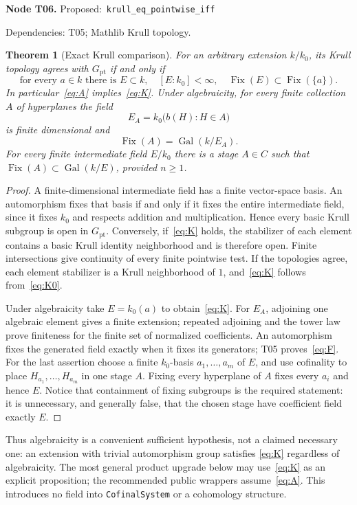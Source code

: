 \documentclass[11pt]{article}
\newtheorem{theorem}{Theorem}[section]
\theoremstyle{remark}\newtheorem{remark}[theorem]{Remark}
\newcommand{\Gal}{\operatorname{Gal}}
\newcommand{\Fix}{\operatorname{Fix}}
\newcommand{\code}[1]{{\normalfont\nolinkurl{#1}}}
\newcommand{\node}[3]{\par\Needspace{8\baselineskip}\smallskip\noindent\textbf{Node #1.}\quad
 \textsf{Proposed:}\ \code{#2}\par\noindent
 \textsf{Dependencies:} #3.\par\smallskip}
\begin{document}
\node{T06}{krull_eq_pointwise_iff}{T05; Mathlib Krull topology}
\begin{theorem}[Exact Krull comparison]\label{thm:t06}
For an arbitrary extension $k/k_0$, its Krull topology agrees with
$G_{\mathrm{pt}}$ if and only if
\[
 \text{for every }a\in k\text{ there is }E\subset k,\quad
 [E:k_0]<\infty,\quad \Fix(E)\subset\Fix(\{a\}).             \tag{K}\label{eq:K}
\]
In particular~\eqref{eq:A} implies~\eqref{eq:K}. Under algebraicity,
for every finite collection $A$ of hyperplanes the field
\[
        E_A=k_0\bigl(b(H):H\in A\bigr)
\]
is finite dimensional and
\[
          \Fix(A)=\Gal(k/E_A).                                \tag{F}\label{eq:F}
\]
For every finite intermediate field $E/k_0$ there is a stage $A\in C$
such that $\Fix(A)\subset\Gal(k/E)$, provided $n\geq1$.
\end{theorem}
\begin{proof}
A finite-dimensional intermediate field has a finite vector-space
basis. An automorphism fixes that basis if and only if it fixes the
entire intermediate field, since it fixes $k_0$ and respects addition
and multiplication. Hence every basic Krull subgroup is open in
$G_{\mathrm{pt}}$. Conversely, if~\eqref{eq:K} holds, the stabilizer
of each element contains a basic Krull identity neighborhood and is
therefore open. Finite intersections give continuity of every finite
pointwise test. If the topologies agree, each element stabilizer is a
Krull neighborhood of $1$, and~\eqref{eq:K} follows from~\eqref{eq:K0}.

Under algebraicity take $E=k_0(a)$ to obtain~\eqref{eq:K}. For $E_A$,
adjoining one algebraic element gives a finite extension; repeated
adjoining and the tower law prove finiteness for the finite set of
normalized coefficients. An automorphism fixes the generated field
exactly when it fixes its generators; T05 proves~\eqref{eq:F}.
For the last assertion choose a finite $k_0$-basis $a_1,\ldots,a_m$ of
$E$, and use cofinality to place $H_{a_1},\ldots,H_{a_m}$ in one
stage $A$. Fixing every hyperplane of $A$ fixes every $a_i$ and hence
$E$. Notice that containment of fixing subgroups is the required
statement: it is unnecessary, and generally false, that the chosen
stage have coefficient field exactly $E$.
\end{proof}

Thus algebraicity is a convenient sufficient hypothesis, not a claimed
necessary one: an extension with trivial automorphism group satisfies
\eqref{eq:K} regardless of algebraicity. The most general product
upgrade below may use~\eqref{eq:K} as an explicit proposition; the
recommended public wrappers assume~\eqref{eq:A}. This introduces no
field into \code{CofinalSystem} or a cohomology structure.
\end{document}
